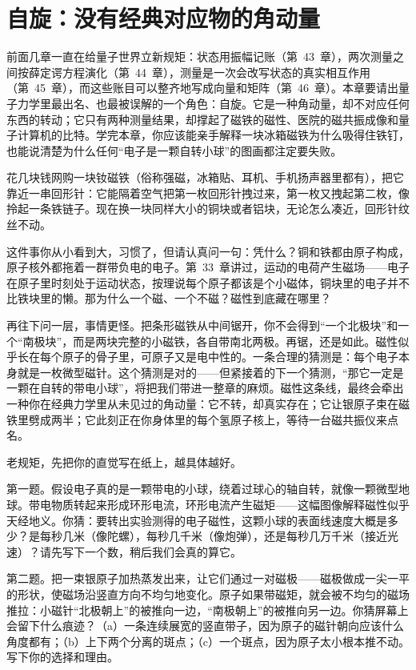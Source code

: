 \chapter{自旋：没有经典对应物的角动量}

前面几章一直在给量子世界立新规矩：状态用振幅记账（第~43~章），两次测量之间按薛定谔方程演化（第~44~章），测量是一次会改写状态的真实相互作用（第~45~章），而这些账目可以整齐地写成向量和矩阵（第~46~章）。本章要请出量子力学里最出名、也最被误解的一个角色：自旋。它是一种角动量，却不对应任何东西的转动；它只有两种测量结果，却撑起了磁铁的磁性、医院的磁共振成像和量子计算机的比特。学完本章，你应该能亲手解释一块冰箱磁铁为什么吸得住铁钉，也能说清楚为什么任何“电子是一颗自转小球”的图画都注定要失败。


花几块钱网购一块钕磁铁（俗称强磁，冰箱贴、耳机、手机扬声器里都有），把它靠近一串回形针：它能隔着空气把第一枚回形针拽过来，第一枚又拽起第二枚，像拎起一条铁链子。现在换一块同样大小的铜块或者铝块，无论怎么凑近，回形针纹丝不动。

这件事你从小看到大，习惯了，但请认真问一句：凭什么？铜和铁都由原子构成，原子核外都拖着一群带负电的电子。第~33~章讲过，运动的电荷产生磁场——电子在原子里时刻处于运动状态，按理说每个原子都该是个小磁体，铜块里的电子并不比铁块里的懒。那为什么一个磁、一个不磁？磁性到底藏在哪里？

再往下问一层，事情更怪。把条形磁铁从中间锯开，你不会得到“一个北极块”和一个“南极块”，而是两块完整的小磁铁，各自带南北两极。再锯，还是如此。磁性似乎长在每个原子的骨子里，可原子又是电中性的。一条合理的猜测是：每个电子本身就是一枚微型磁针。这个猜测是对的——但紧接着的下一个猜测，“那它一定是一颗在自转的带电小球”，将把我们带进一整章的麻烦。磁性这条线，最终会牵出一种你在经典力学里从未见过的角动量：它不转，却真实存在；它让银原子束在磁铁里劈成两半；它此刻正在你身体里的每个氢原子核上，等待一台磁共振仪来点名。


老规矩，先把你的直觉写在纸上，越具体越好。

第一题。假设电子真的是一颗带电的小球，绕着过球心的轴自转，就像一颗微型地球。带电物质转起来形成环形电流，环形电流产生磁矩——这幅图像解释磁性似乎天经地义。你猜：要转出实验测得的电子磁性，这颗小球的表面线速度大概是多少？是每秒几米（像陀螺），每秒几千米（像炮弹），还是每秒几万千米（接近光速）？请先写下一个数，稍后我们会真的算它。

第二题。把一束银原子加热蒸发出来，让它们通过一对磁极——磁极做成一尖一平的形状，使磁场沿竖直方向不均匀地变化。原子如果带磁矩，就会被不均匀的磁场推拉：小磁针“北极朝上”的被推向一边，“南极朝上”的被推向另一边。你猜屏幕上会留下什么痕迹？（a）一条连续展宽的竖直带子，因为原子的磁针朝向应该什么角度都有；（b）上下两个分离的斑点；（c）一个斑点，因为原子太小根本推不动。写下你的选择和理由。

